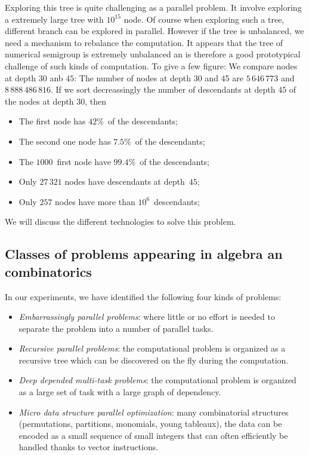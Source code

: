 \documentclass{deliverablereport}
\begin{document}
Exploring this tree is quite challenging as a parallel problem. It involve
exploring a extremely large tree with $10^{15}$ node. Of course when exploring
such a tree, different branch can be explored in parallel. However if the tree
is unbalanced, we need a mechanism to rebalance the computation. It appears
that the tree of numerical semigroup is extremely unbalanced an is therefore a
good prototypical challenge of such kinds of computation. To give a few
figure: We compare nodes at depth $30$ anb $45$: The number of nodes at depth
30 and 45 are $5\,646\,773$ and $8\,888\,486\,816$. If we sort decreassingly
the number of descendants at depth $45$ of the nodes at depth $30$, then
\begin{itemize}
\item The first node has $42\%$~of the descendants;
\item The second one node has $7.5\%$~of the descendants;
\item The $1000$~first node have $99.4\%$~of the descendants;
\item Only $27\,321$ nodes have descendants at depth~$45$;
\item Only $257$ nodes have more than $10^6$~descendants;
\end{itemize}
We will discuss the different technologies to solve this problem.

 
\subsection{Classes of problems appearing in algebra an combinatorics}

In our experiments, we have identified the following four kinds of problems:
\begin{itemize}
\item \emph{Embarrassingly parallel problems}: where little or no effort is
  needed to separate the problem into a number of parallel tasks.
\item \emph{Recursive parallel problems}: the computational problem is
  organized as a recursive tree which can be discovered on the fly during the
  computation.
\item \emph{Deep depended multi-task problems}: the computational problem is
  organized as a large set of task with a large graph of dependency.
\item \emph{Micro data structure parallel optimization}: many combinatorial
  structures (permutations, partitions, monomials, young tableaux), the data
  can be encoded as a small sequence of small integers that can often
  efficiently be handled thanks to vector instructions.
\end{itemize}
\end{document}
